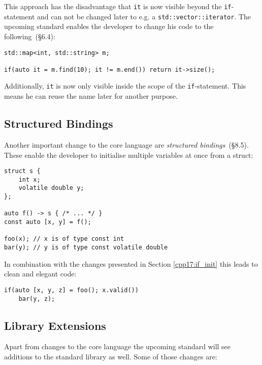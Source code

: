 \noindent This approach has the disadvantage that \texttt{it} is now visible beyond the \texttt{if}-statement and can not be changed later to e.g. a \texttt{std::vector::iterator}. The upcoming standard enables the developer to change his code to the following~\cite{cpp17std}(§6.4):

\begin{verbatim}
std::map<int, std::string> m;

if(auto it = m.find(10); it != m.end()) return it->size();
\end{verbatim}

\noindent Additionally, \texttt{it} is now only visible inside the scope of the \texttt{if}-statement. This means he can reuse the name later for another purpose.

\subsection{Structured Bindings}\label{cpp17:struct_bind}

Another important change to the core language are \textit{structured bindings}~\cite{cpp17std}(§8.5). These enable the developer to initialise multiple variables at once from a struct:

\begin{verbatim}
struct s {
    int x;
    volatile double y;
};

auto f() -> s { /* ... */ }
const auto [x, y] = f();

foo(x); // x is of type const int
bar(y); // y is of type const volatile double
\end{verbatim}

\noindent In combination with the changes presented in Section \ref{cpp17:if_init} this leads to clean and elegant code:

\begin{verbatim}
if(auto [x, y, z] = foo(); x.valid())
    bar(y, z);
\end{verbatim}

\subsection{Library Extensions}\label{cpp17:lib_ext}

Apart from changes to the core language the upcoming standard will see additions to the standard library as well. Some of those changes are:

